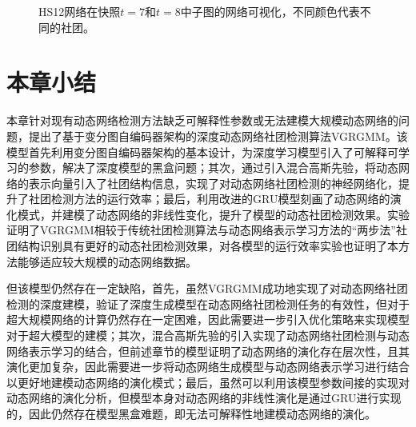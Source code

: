 \begin{figure}[htbp]
{    }
    \caption{HS12网络在快照$t=7$和$t=8$中子图的网络可视化，不同颜色代表不同的社团。}
    \label{fig:case}
\end{figure}






\section{本章小结\label{chap6:summary}}
本章针对现有动态网络检测方法缺乏可解释性参数或无法建模大规模动态网络的问题，提出了基于变分图自编码器架构的深度动态网络社团检测算法VGRGMM。该模型首先利用变分图自编码器架构的基本设计，为深度学习模型引入了可解释可学习的参数，解决了深度模型的黑盒问题；其次，通过引入混合高斯先验，将动态网络的表示向量引入了社团结构信息，实现了对动态网络社团检测的神经网络化，提升了社团检测方法的运行效率；最后，利用改进的GRU模型刻画了动态网络的演化模式，并建模了动态网络的非线性变化，提升了模型的动态社团检测效果。实验证明了VGRGMM相较于传统社团检测算法与动态网络表示学习方法的“两步法”社团结构识别具有更好的动态社团检测效果，对各模型的运行效率实验也证明了本方法能够适应较大规模的动态网络数据。

但该模型仍然存在一定缺陷，首先，虽然VGRGMM成功地实现了对动态网络社团检测的深度建模，验证了深度生成模型在动态网络社团检测任务的有效性，但对于超大规模网络的计算仍然存在一定困难，因此需要进一步引入优化策略来实现模型对于超大模型的建模；其次，混合高斯先验的引入实现了动态网络社团检测与动态网络表示学习的结合，但前述章节的模型证明了动态网络的演化存在层次性，且其演化更加复杂，因此需要进一步将动态网络生成模型与动态网络表示学习进行结合以更好地建模动态网络的演化模式；最后，虽然可以利用该模型参数间接的实现对动态网络的演化分析，但模型本身对动态网络的非线性演化是通过GRU进行实现的，因此仍然存在模型黑盒难题，即无法可解释性地建模动态网络的演化。







